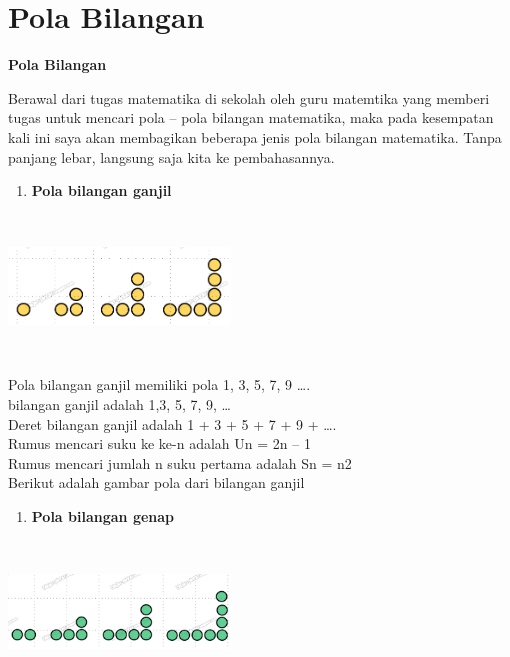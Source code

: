 \documentclass[11pt,fleqn]{book} %
\begin{document}
\section{Pola Bilangan}
\begin{center}
	\LARGE \textbf{Pola Bilangan}
\end{center}
\noindent
Berawal dari tugas matematika di sekolah oleh guru matemtika yang memberi tugas untuk mencari pola – pola bilangan matematika, maka pada kesempatan kali ini saya akan membagikan beberapa jenis pola bilangan matematika. Tanpa panjang lebar, langsung saja kita ke pembahasannya.\\
\noindent
\begin{enumerate}
	\item  \textbf{Pola bilangan ganjil}
\end{enumerate}
\noindent
\begin{center}
	\noindent \includegraphics*[width=2.32in, height=1.48in, keepaspectratio=false, trim=0.00in 0.11in 0.00in 0.00in]{Pictures/21.PNG}
\end{center}
\noindent
\noindent Pola bilangan ganjil memiliki pola 1, 3, 5, 7, 9 ….\\
\noindent bilangan ganjil adalah 1,3, 5, 7, 9, …\\
\noindent Deret bilangan ganjil adalah 1 + 3 + 5 + 7 + 9 + ….\\
\noindent Rumus mencari suku ke ke-n adalah Un = 2n – 1\\
\noindent Rumus mencari jumlah n suku pertama adalah Sn = n2\\
\noindent Berikut adalah gambar pola dari bilangan ganjil\\

\noindent
\begin{enumerate}
	\item  \textbf{ Pola bilangan genap}
\end{enumerate}
\noindent
\begin{center}
	\noindent \includegraphics*[width=2.32in, height=1.48in, keepaspectratio=false, trim=0.00in 0.11in 0.00in 0.00in]{Pictures/22.PNG}
\end{center}
\end{document}
